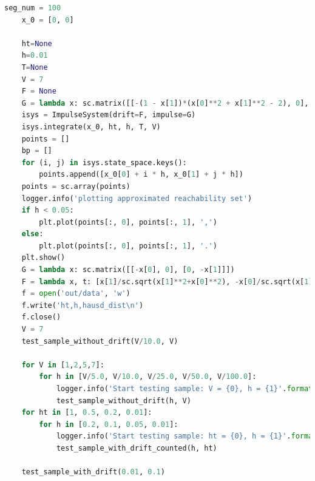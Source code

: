 \documentclass[a4paper,12pt]{article}
\begin{document}
\begin{lstlisting}[language=Python,
caption={Интерфейс Impulse System}]
    seg_num = 100
    x_0 = [0, 0]

    ht=None
    h=0.01
    T=None
    V = 7
    F = None
    G = lambda x: sc.matrix([[-(1 - x[1])*(x[0]**2 + x[1]**2 - 2), 0], [0, -(1 - x[0])*(x[0]**2 + x[1]**2 - 2)]])
    isys = ImpulseSystem(drift=F, impulse=G)
    isys.integrate(x_0, ht, h, T, V)
    points = []
    bp = []
    for (i, j) in isys.state_space.keys():
        points.append([x_0[0] + i * h, x_0[1] + j * h])
    points = sc.array(points)
    logger.info('plotting approximated reachability set')
    if h < 0.05:
        plt.plot(points[:, 0], points[:, 1], ',')
    else:
        plt.plot(points[:, 0], points[:, 1], '.')
    plt.show()
    G = lambda x: sc.matrix([[-x[0], 0], [0, -x[1]]])
    F = lambda x, t: [x[1]/sc.sqrt(x[1]**2+x[0]**2), -x[0]/sc.sqrt(x[1]**2+x[0]**2)]
    f = open('out/data', 'w')
    f.write('ht,h,hausd_dist\n')
    f.close()
    V = 7
    test_sample_without_drift(V/10.0, V)

    for V in [1,2,5,7]:
        for h in [V/5.0, V/10.0, V/25.0, V/50.0, V/100.0]:
            logger.info('Start testing sample: V = {0}, h = {1}'.format(V, h))
            test_sample_without_drift(h, V)
    for ht in [1, 0.5, 0.2, 0.01]:
        for h in [0.2, 0.1, 0.05, 0.01]:
            logger.info('Start testing sample: ht = {0}, h = {1}'.format(ht, h))
            test_sample_with_drift_counted(h, ht)

    test_sample_with_drift(0.01, 0.1)

\end{lstlisting}
\end{document}
